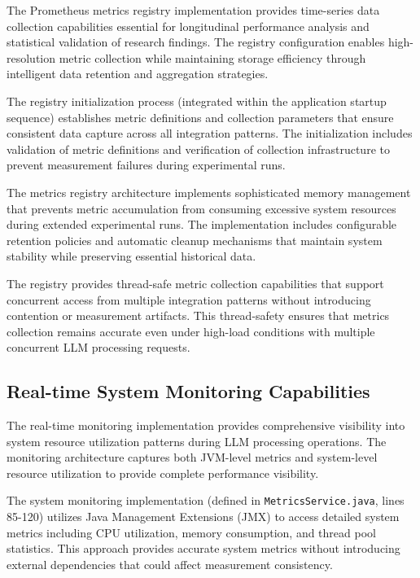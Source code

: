 The Prometheus metrics registry implementation provides time-series data collection capabilities essential for longitudinal performance analysis and statistical validation of research findings. The registry configuration enables high-resolution metric collection while maintaining storage efficiency through intelligent data retention and aggregation strategies.

The registry initialization process (integrated within the application startup sequence) establishes metric definitions and collection parameters that ensure consistent data capture across all integration patterns. The initialization includes validation of metric definitions and verification of collection infrastructure to prevent measurement failures during experimental runs.

The metrics registry architecture implements sophisticated memory management that prevents metric accumulation from consuming excessive system resources during extended experimental runs. The implementation includes configurable retention policies and automatic cleanup mechanisms that maintain system stability while preserving essential historical data.

The registry provides thread-safe metric collection capabilities that support concurrent access from multiple integration patterns without introducing contention or measurement artifacts. This thread-safety ensures that metrics collection remains accurate even under high-load conditions with multiple concurrent LLM processing requests.

\subsection{Real-time System Monitoring Capabilities}

The real-time monitoring implementation provides comprehensive visibility into system resource utilization patterns during LLM processing operations. The monitoring architecture captures both JVM-level metrics and system-level resource utilization to provide complete performance visibility.

The system monitoring implementation (defined in \texttt{MetricsService.java}, lines 85-120) utilizes Java Management Extensions (JMX) to access detailed system metrics including CPU utilization, memory consumption, and thread pool statistics. This approach provides accurate system metrics without introducing external dependencies that could affect measurement consistency.


